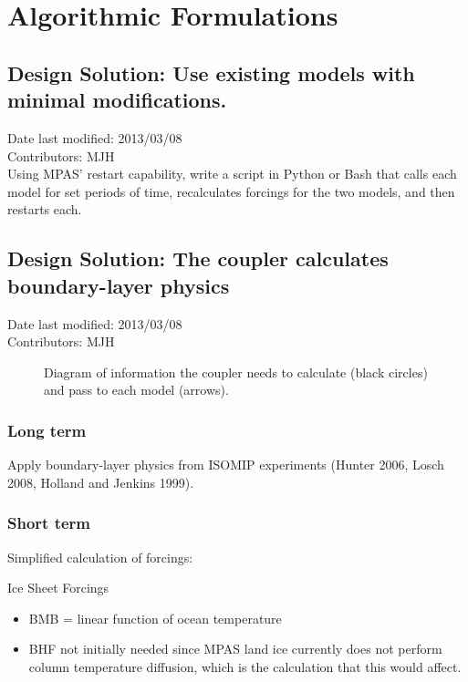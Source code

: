 \documentclass[11pt]{report}
\begin{document}

\chapter{Algorithmic Formulations}

\section{Design Solution: Use existing models with minimal modifications.}
Date last modified: 2013/03/08 \\
Contributors: MJH \\

Using MPAS' restart capability, write a script in Python or Bash that calls each model for set periods of time, recalculates forcings for the two models, and then restarts each.    

\section{Design Solution: The coupler calculates boundary-layer physics}
Date last modified: 2013/03/08 \\
Contributors: MJH \\



\begin{figure}
  \caption{Diagram of information the coupler needs to calculate (black circles) and pass to each model (arrows).}
  \label{coupler}
\end{figure} 

\subsection{Long term}
 Apply boundary-layer physics from ISOMIP experiments (Hunter 2006, Losch 2008, Holland and Jenkins 1999).

\subsection{Short term}
Simplified calculation of forcings:

Ice Sheet Forcings
\begin{itemize}
\item
BMB = linear function of ocean temperature
\item 
BHF not initially needed since MPAS land ice currently does not perform column temperature diffusion, which is the calculation that this would affect.
\end{itemize}
\end{document}
